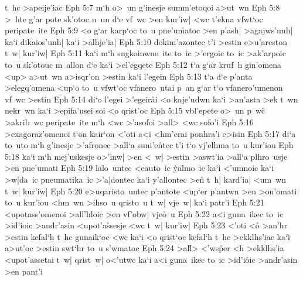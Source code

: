t~hc
>apeije'iac\bibvsend
\vs Eph 5:7
m`h
o>~un
g'inesje
summ'etoqoi
a>ut~wn\bibvsend
\vs Eph 5:8
>~hte
g'ar
pote
sk'otoc
n~un
d`e
vf~wc
>en
kur'iw|
<wc
t'ekna
vfwt`oc
peripate~ite\bibvsend
\vs Eph 5:9
<o
g`ar
karp`oc
to~u
pne'u\r{m}atoc
>en
p'ash|
>agajws'unh|
ka`i
dikaios'unh|
ka`i
>alhje'ia|\bibvsend
\vs Eph 5:10
dokim'azontec
t'i
>estin
e>u'areston
t~w|
kur'iw|\bibvsend
\vs Eph 5:11
ka`i
m`h
sugkoinwne~ite
to~ic
>'ergoic
to~ic
>ak'arpoic
to~u
sk'otouc
m~allon
d`e
ka`i
>el'egqete\bibvsend
\vs Eph 5:12
t`a
g`ar
kruf~h
gin'omena
<up>
a>ut~wn
a>isqr'on
>estin
ka`i
l'egein\bibvsend
\vs Eph 5:13
t`a
d`e
p'anta
>elegq'omena
<up`o
to~u
vfwt`oc
vfanero~utai
p~an
g`ar
t`o
vfanero'umenon
vf~wc
>estin\bibvsend
\vs Eph 5:14
di`o
l'egei
>'egeir\r{a}i
<o
kaje'udwn
ka`i
>an'asta
>ek
t~wn
nekr~wn
ka`i
>epifa'usei
soi
<o
qrist'oc\bibvsend
\vs Eph 5:15
vbl'epete
o>~un
p~wc\r{}
>akrib~wc
peripate~ite
m`h
<wc
>'asofoi
>all>
<wc
sofo'i\bibvsend
\vs Eph 5:16
>exagoraz'omenoi
t`on
kair`on
<'oti
a<i
<hm'erai
ponhra'i
e>isin\bibvsend
\vs Eph 5:17
di`a
to~uto
m`h
g'inesje
>'afronec
>all`a
suni'e\r{n}tec
t'i
t`o
vj'elhma
to~u
kur'iou\bibvsend
\vs Eph 5:18
ka`i
m`h
mej'uskesje
o>'inw|
>en
<~w|
>estin
>aswt'ia
>all`a
plhro~usje
>en
pne'umati\bibvsend
\vs Eph 5:19
lalo~untec
<eauto~ic
\r{y}almo~ic
ka`i
<'umnoic
ka`i
>w|da~ic
pneumatika~ic
>'a|dontec
ka`i
y'allontec
>e\r{n}
t~h|
kard'ia|
<um~wn
t~w|
kur'iw|\bibvsend
\vs Eph 5:20
e>uqaristo~untec
p'antote
<up`er
p'antwn
>en
>on'omati
to~u
kur'iou
<hm~wn
>ihso~u
qristo~u
t~w|
vje~w|
ka`i
patr'i\bibvsend
\vs Eph 5:21
<upotass'omenoi
>all'hloic
>en
vf'obw|
vje\r{o}~u\bibvsend
{}
\vs Eph 5:22
a<i
guna~ikec
to~ic
>id'ioic
>andr'asin
<upot'a\r{s}sesje
<wc
t~w|
kur'iw|\bibvsend
\vs Eph 5:23
<'oti
<o\r{}
>an'hr
>estin
kefal`h
t~hc
gunaik`oc
<wc
ka`i
<o
qrist`oc
kefal`h
t~hc
>ekklhs'iac
ka`i\r{}
a>ut'oc
>estin
swt`hr
to~u
s'wmatoc\bibvsend
\vs Eph 5:24
>al\r{l}>
<'ws\r{p}er
<h
>ekklhs'ia
<upot'assetai
t~w|
qrist~w|
o<'utwc
ka`i
a<i
guna~ikec
to~ic
>id'i\r{o}ic
>andr'asin
>en
pant'i\bibvsend
